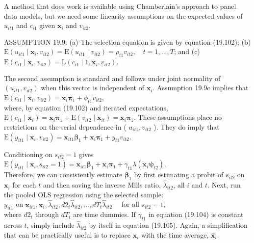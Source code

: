 \documentclass[10pt]{article}
\begin{document}
A method that does work is available using Chamberlain's approach to panel data models, but we need some linearity assumptions on the expected values of $u_{i t 1}$ and $c_{i 1}$ given $\mathbf{x}_{i}$ and $v_{i t 2}$.

ASSUMPTION 19.9: (a) The selection equation is given by equation (19.102); (b) $\mathrm{E}\left(u_{i t 1} \mid \mathbf{x}_{i}, v_{i t 2}\right)=\mathrm{E}\left(u_{i t 1} \mid v_{i t 2}\right)=\rho_{t 1} v_{i t 2}, \quad t=1, \ldots, T$; and (c) $\mathrm{E}\left(c_{i 1} \mid \mathbf{x}_{i}, v_{i t 2}\right)= \mathrm{L}\left(c_{i 1} \mid 1, \mathbf{x}_{i}, v_{i t 2}\right)$.

The second assumption is standard and follows under joint normality of $\left(u_{i t 1}, v_{i t 2}\right)$ when this vector is independent of $\mathbf{x}_{i}$. Assumption 19.9c implies that\\
$\mathrm{E}\left(c_{i 1} \mid \mathbf{x}_{i}, v_{i t 2}\right)=\mathbf{x}_{i} \boldsymbol{\pi}_{1}+\phi_{t 1} v_{i t 2}$,\\
where, by equation (19.102) and iterated expectations, $\mathrm{E}\left(c_{i 1} \mid \mathbf{x}_{i}\right)=\mathbf{x}_{i} \boldsymbol{\pi}_{1}+\mathrm{E}\left(v_{i t 2} \mid \mathbf{x}_{i t}\right) =\mathbf{x}_{i} \boldsymbol{\pi}_{1}$. These assumptions place no restrictions on the serial dependence in ( $u_{i t 1}, v_{i t 2}$ ). They do imply that\\
$\mathrm{E}\left(y_{i t 1} \mid \mathbf{x}_{i}, v_{i t 2}\right)=\mathbf{x}_{i t 1} \boldsymbol{\beta}_{1}+\mathbf{x}_{i} \boldsymbol{\pi}_{1}+y_{t 1} v_{i t 2}$.

Conditioning on $s_{i t 2}=1$ gives\\
$\mathrm{E}\left(y_{i t 1} \mid \mathbf{x}_{i}, s_{i t 2}=1\right)=\mathbf{x}_{i t 1} \boldsymbol{\beta}_{1}+\mathbf{x}_{i} \boldsymbol{\pi}_{1}+\gamma_{t 1} \lambda\left(\mathbf{x}_{i} \boldsymbol{\psi}_{t 2}\right)$.\\
Therefore, we can consistently estimate $\boldsymbol{\beta}_{1}$ by first estimating a probit of $s_{i t 2}$ on $\mathbf{x}_{i}$ for each $t$ and then saving the inverse Mills ratio, $\hat{\lambda}_{i t 2}$, all $i$ and $t$. Next, run the pooled OLS regression using the selected sample:\\
$y_{i t 1}$ on $\mathbf{x}_{i t 1}, \mathbf{x}_{i}, \hat{\lambda}_{i t 2}, d 2_{t} \hat{\lambda}_{i t 2}, \ldots, d T_{t} \hat{\lambda}_{i t 2} \quad$ for all $s_{i t 2}=1$,\\
where $d 2_{t}$ through $d T_{t}$ are time dummies. If $\gamma_{t 1}$ in equation (19.104) is constant across $t$, simply include $\hat{\lambda}_{i t 2}$ by itself in equation (19.105). Again, a simplification that can be practically useful is to replace $\mathbf{x}_{i}$ with the time average, $\overline{\mathbf{x}}_{i}$.
\end{document}
